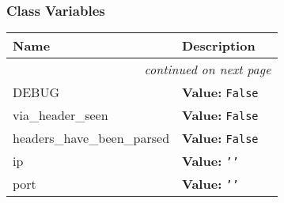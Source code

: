 
  \subsubsection{Class Variables}

    \vspace{-1cm}
\hspace{\varindent}\begin{longtable}{|p{\varnamewidth}|p{\vardescrwidth}|l}
\cline{1-2}
\cline{1-2} \centering \textbf{Name} & \centering \textbf{Description}& \\
\cline{1-2}
\endhead\cline{1-2}\multicolumn{3}{r}{\small\textit{continued on next page}}\\\endfoot\cline{1-2}
\endlastfoot\raggedright D\-E\-B\-U\-G\- & \raggedright \textbf{Value:} 
{\tt False}&\\
\cline{1-2}
\raggedright v\-i\-a\-\_\-h\-e\-a\-d\-e\-r\-\_\-s\-e\-e\-n\- & \raggedright \textbf{Value:} 
{\tt False}&\\
\cline{1-2}
\raggedright h\-e\-a\-d\-e\-r\-s\-\_\-h\-a\-v\-e\-\_\-b\-e\-e\-n\-\_\-p\-a\-r\-s\-e\-d\- & \raggedright \textbf{Value:} 
{\tt False}&\\
\cline{1-2}
\raggedright i\-p\- & \raggedright \textbf{Value:} 
{\tt \texttt{'}\texttt{}\texttt{'}}&\\
\cline{1-2}
\raggedright p\-o\-r\-t\- & \raggedright \textbf{Value:} 
{\tt \texttt{'}\texttt{}\texttt{'}}&\\
\cline{1-2}
\end{longtable}

